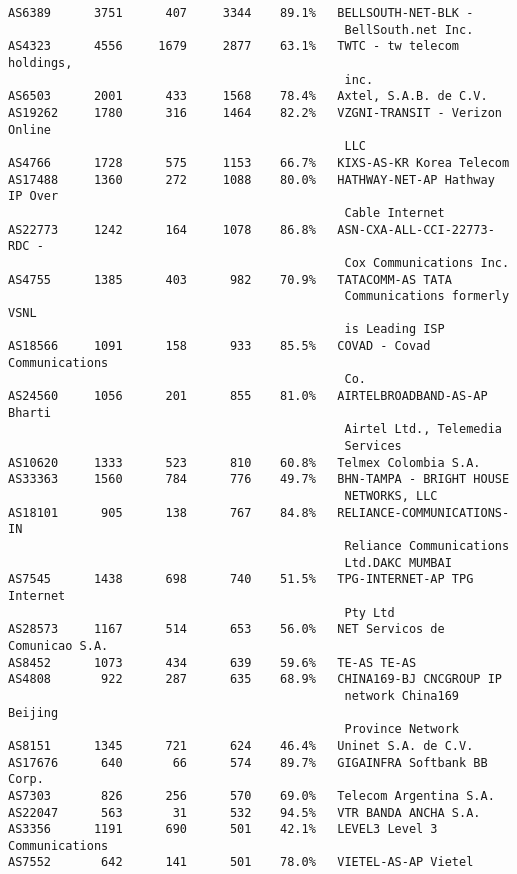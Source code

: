 \begin{lstlisting}[frame=trl]
AS6389      3751      407     3344    89.1%   BELLSOUTH-NET-BLK -
                                               BellSouth.net Inc.
AS4323      4556     1679     2877    63.1%   TWTC - tw telecom holdings,
                                               inc.
AS6503      2001      433     1568    78.4%   Axtel, S.A.B. de C.V.
AS19262     1780      316     1464    82.2%   VZGNI-TRANSIT - Verizon Online
                                               LLC
AS4766      1728      575     1153    66.7%   KIXS-AS-KR Korea Telecom
AS17488     1360      272     1088    80.0%   HATHWAY-NET-AP Hathway IP Over
                                               Cable Internet
AS22773     1242      164     1078    86.8%   ASN-CXA-ALL-CCI-22773-RDC -
                                               Cox Communications Inc.
AS4755      1385      403      982    70.9%   TATACOMM-AS TATA
                                               Communications formerly VSNL
                                               is Leading ISP
AS18566     1091      158      933    85.5%   COVAD - Covad Communications
                                               Co.
AS24560     1056      201      855    81.0%   AIRTELBROADBAND-AS-AP Bharti
                                               Airtel Ltd., Telemedia
                                               Services
AS10620     1333      523      810    60.8%   Telmex Colombia S.A.
AS33363     1560      784      776    49.7%   BHN-TAMPA - BRIGHT HOUSE
                                               NETWORKS, LLC
AS18101      905      138      767    84.8%   RELIANCE-COMMUNICATIONS-IN
                                               Reliance Communications
                                               Ltd.DAKC MUMBAI
AS7545      1438      698      740    51.5%   TPG-INTERNET-AP TPG Internet
                                               Pty Ltd
AS28573     1167      514      653    56.0%   NET Servicos de Comunicao S.A.
AS8452      1073      434      639    59.6%   TE-AS TE-AS
AS4808       922      287      635    68.9%   CHINA169-BJ CNCGROUP IP
                                               network China169 Beijing
                                               Province Network
AS8151      1345      721      624    46.4%   Uninet S.A. de C.V.
AS17676      640       66      574    89.7%   GIGAINFRA Softbank BB Corp.
AS7303       826      256      570    69.0%   Telecom Argentina S.A.
AS22047      563       31      532    94.5%   VTR BANDA ANCHA S.A.
AS3356      1191      690      501    42.1%   LEVEL3 Level 3 Communications
AS7552       642      141      501    78.0%   VIETEL-AS-AP Vietel

\end{lstlisting}
